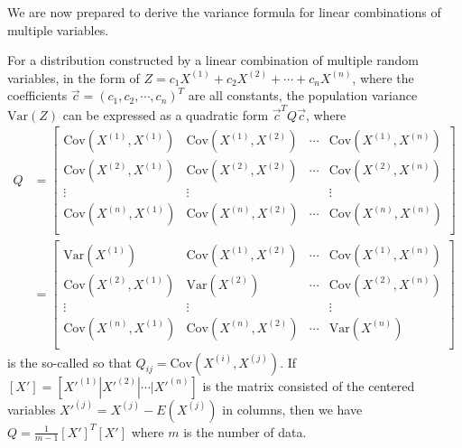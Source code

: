 We are now prepared to derive the variance formula for linear combinations of multiple variables.
\begin{proper}
\label{proper:variancemul}
For a distribution constructed by a linear combination of multiple random variables, in the form of $Z = c_1X^{(1)} + c_2X^{(2)} + \cdots + c_nX^{(n)}$, where the coefficients $\vec{c} = (c_1, c_2, \cdots, c_n)^T$ are all constants, the population variance $\text{Var}(Z)$ can be expressed as a quadratic form $\vec{c}^TQ\vec{c}$, where
\begin{align*}
Q &=
\begin{bmatrix}
\text{Cov}(X^{(1)}, X^{(1)}) & \text{Cov}(X^{(1)}, X^{(2)}) & \cdots & \text{Cov}(X^{(1)}, X^{(n)}) \\
\text{Cov}(X^{(2)}, X^{(1)}) & \text{Cov}(X^{(2)}, X^{(2)}) & \cdots & \text{Cov}(X^{(2)}, X^{(n)}) \\
\vdots & \vdots &  & \vdots \\
\text{Cov}(X^{(n)}, X^{(1)}) & \text{Cov}(X^{(n)}, X^{(2)}) & \cdots & \text{Cov}(X^{(n)}, X^{(n)}) \\
\end{bmatrix} \\
&=
\begin{bmatrix}
\text{Var}(X^{(1)}) & \text{Cov}(X^{(1)}, X^{(2)}) & \cdots & \text{Cov}(X^{(1)}, X^{(n)}) \\
\text{Cov}(X^{(2)}, X^{(1)}) & \text{Var}(X^{(2)}) & \cdots & \text{Cov}(X^{(2)}, X^{(n)}) \\
\vdots & \vdots &  & \vdots \\
\text{Cov}(X^{(n)}, X^{(1)}) & \text{Cov}(X^{(n)}, X^{(2)}) & \cdots & \text{Var}(X^{(n)}) \\
\end{bmatrix} 
\end{align*}
is the so-called  so that $Q_{ij} = \text{Cov}(X^{(i)}, X^{(j)})$. If $[X'] = [X'^{(1)}|X'^{(2)}|\cdots|X'^{(n)}]$ is the matrix consisted of the centered variables $X'^{(j)} = X^{(j)} - E(X^{(j)})$ in columns, then we have $Q = \frac{1}{m-1}[X']^T[X']$ where $m$ is the number of data.
\end{proper}
